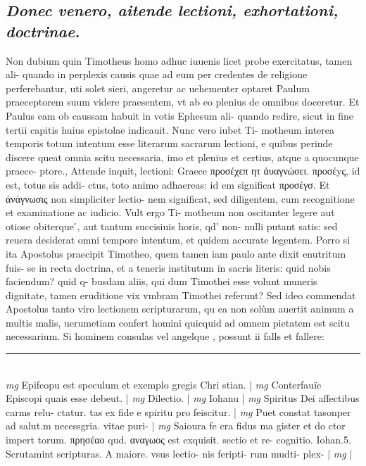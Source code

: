 \documentclass{article}
\begin{document}
\begin{pages}
\subsection*{\textit{Donec venero, aitende lectioni, exhortationi, doctrinae. }}\pstart Non dubium quin Timotheus homo adhuc iuuenis licet probe exercitatus, tamen ali- quando in perplexis causis quae ad eum per credentes de religione perferebantur, uti solet sieri, angeretur ac uehementer optaret Paulum praeceptorem suum videre praesentem, vt ab eo plenius de omnibus doceretur. Et Paulus eam ob caussam habuit in votis Ephesum ali- quando redire, sicut in fine tertii capitis huius epistolae indicauit. Nunc vero iubet Ti- motheum interea temporis totum intentum esse literarum sacrarum lectioni, e quibus perinde discere queat omnia scitu necessaria, imo et plenius et certius, atque a quocunque praece- ptore., Attende inquit, lectioni: Graece προσέχεπ ητ ἀυαγνώσει. προσέyς, id est, totus sis addi- ctus, toto animo adhaereas: id em significat προσέγσ. Et ἀνάγνωσις non simpliciter lectio- nem significat, sed diligentem, cum recognitione et examinatione ac iudicio. Vult ergo Ti- motheum non oscitanter legere aut otiose obiterque ́, aut tantum succisiuis horis, qd' non- nulli putant satis: sed reuera desiderat omni tempore intentum, et quidem accurate legentem. Porro si ita Apostolus praecipit Timotheo, quem tamen iam paulo ante dixit enutritum fuis- se in recta doctrina, et a teneris institutum in sacris literis: quid nobis faciendum? quid q- busdam aliis, qui dum Timothei esse volunt muneris dignitate, tamen eruditione vix vmbram Timothei referunt? Sed ideo commendat Apostolus tanto viro lectionem scripturarum, qu ea non solùm auertit animum a multis malis, uerumetiam confert homini quicquid ad omnem pietatem est scitu necessarium. Si hominem consulas vel angelque , possunt ii falls et fallere:  \pend
\vspace{0.5cm}\noindent
\vspace{0.2cm}\rule{1cm}{0.2pt}\\ 
\hspace{0.2cm}\textit{mg}
\footnotesize Epifcopu est speculum et exemplo gregis Chri stian. 
\normalsize| 
\hspace{0.2cm}\textit{mg}
\footnotesize Conterfauïe Episcopi quais esse debeut. 
\normalsize| 
\hspace{0.2cm}\textit{mg}
\footnotesize Dilectio. 
\normalsize| 
\hspace{0.2cm}\textit{mg}
\footnotesize Iohanu 
\normalsize| 
\hspace{0.2cm}\textit{mg}
\footnotesize Spiritus Dei affectibus carms relu- ctatur. tas ex fide e spiritu pro feiscitur. 
\normalsize| 
\hspace{0.2cm}\textit{mg}
\footnotesize Puet constat tasonper ad salut.m necessgria. vitae puri- 
\normalsize| 
\hspace{0.2cm}\textit{mg}
\footnotesize Saioura fe cra fidus ma gister et do ctor impert torum. πρησέαο qud. αναγωος est exquisit. sectio et re- cognitio. Iohan.5. Scrutamint scripturas. A maiore. vsus lectio- nis feripti- rum mudti- plex- 
\normalsize| 
\hspace{0.2cm}\textit{mg}
\footnotesize 
\normalsize| 

\end{pages}
\end{document}
